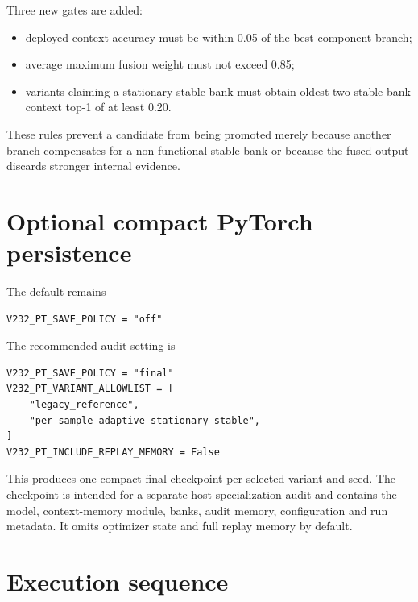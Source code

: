 \documentclass[11pt,a4paper]{article}
\begin{document}
Three new gates are added:

\begin{itemize}[leftmargin=1.5em]
\item deployed context accuracy must be within 0.05 of the best component branch;
\item average maximum fusion weight must not exceed 0.85;
\item variants claiming a stationary stable bank must obtain oldest-two stable-bank context top-1 of at least 0.20.
\end{itemize}

These rules prevent a candidate from being promoted merely because another branch compensates for a non-functional stable bank or because the fused output discards stronger internal evidence.

\section{Optional compact PyTorch persistence}

The default remains

\begin{lstlisting}
V232_PT_SAVE_POLICY = "off"
\end{lstlisting}

The recommended audit setting is

\begin{lstlisting}
V232_PT_SAVE_POLICY = "final"
V232_PT_VARIANT_ALLOWLIST = [
    "legacy_reference",
    "per_sample_adaptive_stationary_stable",
]
V232_PT_INCLUDE_REPLAY_MEMORY = False
\end{lstlisting}

This produces one compact final checkpoint per selected variant and seed. The checkpoint is intended for a separate host-specialization audit and contains the model, context-memory module, banks, audit memory, configuration and run metadata. It omits optimizer state and full replay memory by default.

\section{Execution sequence}
\end{document}
